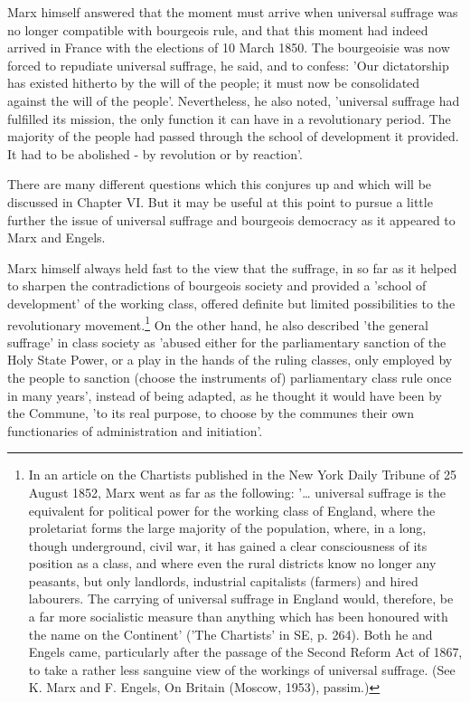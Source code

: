  Marx himself answered that the moment must arrive when universal suffrage was no longer compatible with bourgeois rule, and that this moment had indeed arrived in France with the elections of 10 March 1850. The bourgeoisie was now forced to repudiate universal suffrage, he said, and to confess: 'Our dictatorship has existed hitherto by the will of the people; it must now be consolidated against the will of the people'. Nevertheless, he also noted, 'universal suffrage had fulfilled its mission, the only function it can have in a revolutionary period. The majority of the people had passed through the school of development it provided. It had to be abolished - by revolution or by reaction'.
 
 There are many different questions which this conjures up and which will be discussed in Chapter VI. But it may be useful at this point to pursue a little further the issue of universal suffrage and bourgeois democracy as it appeared to Marx and Engels.

Marx himself always held fast to the view that the suffrage, in so far as it helped to sharpen the contradictions of bourgeois society and provided a 'school of development' of the working class, offered definite but limited possibilities to the revolutionary movement.\footnote{In an article on the Chartists published in the New York Daily Tribune of 25 August 1852, Marx went as far as the following: '\dots{} universal suffrage is the equivalent for political power for the working class of England, where the proletariat forms the large majority of the population, where, in a long, though underground, civil war, it has gained a clear consciousness of its position as a class, and where even the rural districts know no longer any peasants, but only landlords, industrial capitalists (farmers) and hired labourers. The carrying of universal suffrage in England would, therefore, be a far more socialistic measure than anything which has been honoured with the name on the Continent' ('The Chartists' in SE, p. 264). Both he and Engels came, particularly after the passage of the Second Reform Act of 1867, to take a rather less sanguine view of the workings of universal suffrage. (See K. Marx and F. Engels, On Britain (Moscow, 1953), passim.)} On the other hand, he also described 'the general suffrage' in class society as 'abused either for the parliamentary sanction of the Holy State Power, or a play in the hands of the ruling classes, only employed by the people to sanction (choose the instruments of) parliamentary class rule once in many years', instead of being adapted, as he thought it would have been by the Commune, 'to its real purpose, to choose by the communes their own functionaries of administration and initiation'.

